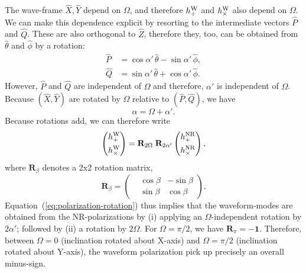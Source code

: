 \documentclass[11pt,tightenlines,article,amssymb,amsmath,amsfonts,superscriptaddress,nofootinbib]{revtex4}
\newcommand{\EtNR}{{\hat\theta}}
\newcommand{\EpNR}{{\hat\phi}}
\newcommand{\hpNR}{h_+^{\rm NR}}
\newcommand{\hcNR}{h_{\times}^{\rm NR}}
\newcommand{\ExW}{\hat X}
\newcommand{\EyW}{\hat Y}
\newcommand{\EzW}{\hat Z}
\newcommand{\hpW}{h_+^{\rm W}}
\newcommand{\hcW}{h_\times^{\rm W}}
\begin{document}
The wave-frame $\ExW, \EyW$ depend on $\Omega$, and therefore $\hpW$
and $\hcW$ also depend on $\Omega$.  We can make this dependence
explicit by resorting to the intermediate vectors $\hat P$ and
$\hat Q$.  These are also orthogonal to $\EzW$, therefore they, too,
can be obtained from $\EtNR$ and $\EpNR$ by a rotation:
\begin{subequations}
\begin{align}
\hat P & = \cos\alpha'\,\EtNR - \sin\alpha'\,\EpNR,\\
\hat Q & = \sin\alpha'\,\EtNR + \cos\alpha'\,\EpNR.
\end{align}
\end{subequations}
However, $\hat P$ and $\hat Q$ are independent of $\Omega$ and
therefore, $\alpha'$ is independent of $\Omega$.  Because
$(\ExW, \EyW)$ are rotated by $\Omega$ relative to $(\hat P, \hat Q)$,
we have
\begin{equation}
\alpha = \Omega+\alpha'.
\end{equation}
Because rotations add, we can therefore write
\begin{equation}\label{eq:polarization-rotation}
\left(\begin{aligned}\hpW\\\hcW \end{aligned}\right)
= {\mathbf R}_{2\Omega}\; {\mathbf R}_{2\alpha'} 
\left(\begin{aligned}\hpNR\\\hcNR \end{aligned}\right),
\end{equation}
where ${\mathbf R}_\beta$ denotes a 2x2 rotation matrix,
\begin{equation}
{\mathbf R}_\beta = \left(\begin{aligned}&\cos\beta & -\sin\beta \\ & \sin\beta & \cos\beta\end{aligned}\right).
\end{equation}
Equation~(\ref{eq:polarization-rotation}) thus implies that the
waveform-modes are obtained from the NR-polarizations by (i) applying
an $\Omega$-independent rotation by $2\alpha'$; followed by (ii) a
rotation by $2\Omega$.
For $\Omega=\pi/2$, we have ${\mathbf R}_\pi = -{\mathbf 1}$.
Therefore, between $\Omega=0$ (inclination rotated about X-axis) and
$\Omega=\pi/2$ (inclination rotated about Y-axis), the waveform
polarization pick up precisely an overall minus-sign. 


\end{document}
